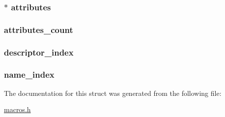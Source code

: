 \subsubsection[{attributes}]{$\ast$ attributes}\label{structfield__info_aae221e548ab4ef529cd1a0f2fcdabb9b}
\hypertarget{structfield__info_aa53122439ee827a418258d52c51368c6}{}
\subsubsection[{attributes\+\_\+count}]{ attributes\+\_\+count}\label{structfield__info_aa53122439ee827a418258d52c51368c6}
\hypertarget{structfield__info_a3f13794b6c8b4ffc87b87a7c01a69060}{}
\subsubsection[{descriptor\+\_\+index}]{ descriptor\+\_\+index}\label{structfield__info_a3f13794b6c8b4ffc87b87a7c01a69060}
\hypertarget{structfield__info_ae939ac3ca00f5727beaa02d0e339183d}{}
\subsubsection[{name\+\_\+index}]{ name\+\_\+index}\label{structfield__info_ae939ac3ca00f5727beaa02d0e339183d}


The documentation for this struct was generated from the following file\+:\begin{DoxyCompactItemize}
\item 
\hyperlink{macros_8h}{macros.\+h}\end{DoxyCompactItemize}
